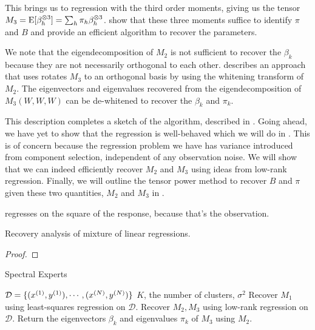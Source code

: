 This brings us to regression with the third order moments, giving us the
tensor $M_3 = \operatorname{E}[\beta_h ^{\otimes 3}] = \sum_h \pi_h \beta_h^{\otimes 3}$.
\citet{AnandkumarGeHsu} show that these three moments suffice to
identify $\pi$ and $B$ and provide an efficient algorithm to recover the
parameters.

We note that the eigendecomposition of $M_2$ is not sufficient to
recover the $\beta_k$ because they are not necessarily orthogonal to
each other. \citet{AnandkumarGeHsu2012} describes an approach that uses
rotates $M_3$ to an orthogonal basis by using the whitening transform of
$M_2$. The eigenvectors and eigenvalues recovered from the
eigendecomposition of $M_3(W, W, W)$ can be de-whitened to recover the
$\beta_k$ and $\pi_k$.

This description completes a sketch of the algorithm, described in
. Going ahead, we have yet to show
that the regression is well-behaved which we will do in
. This is of concern because the regression
problem we have has variance introduced from component selection,
independent of any observation noise. We will show that we can indeed
efficiently recover $M_2$ and $M_3$ using ideas from low-rank
regression. Finally, we will outline the tensor power method to recover
$B$ and $\pi$ given these two quantities, $M_2$ and $M_3$ in
. 

\cite{candesPhaseLift} regresses on the square of the response,
because that's the observation.

\begin{theorem}
  Recovery analysis of mixture of linear regressions.
\end{theorem}
\begin{proof}
\end{proof}

\begin{algorithm}[t]
  \caption{Spectral Experts}
  \label{algo:spectral-experts}
  \begin{algorithmic}[1]
    \REQUIRE $\mathcal{D} = \{ (x^{(1)}, y^{(1)}), \cdots, (x^{(N)}, y^{(N)}) \}$
    \REQUIRE $K$, the number of clusters, $\sigma^2$ 
    \STATE Recover $M_1$ using least-squares regression on $\mathcal{D}$.
    \STATE Recover $M_2, M_3$ using low-rank regression on $\mathcal{D}$.
    \STATE Return the eigenvectors $\beta_k$ and eigenvalues $\pi_k$ of $M_3$ using $M_2$.
  \end{algorithmic}
\end{algorithm}

